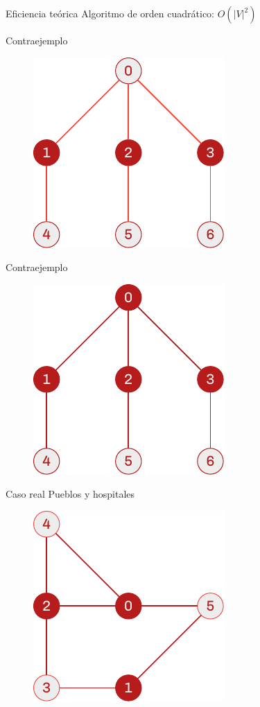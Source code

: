 \documentclass[spanish]{beamer}
\begin{document}
\begin{frame}{Eficiencia teórica}
	Algoritmo de orden cuadrático: $O(|V|^2)$
	

\end{frame}

\begin{frame}{Contraejemplo}

	\begin{figure}[H]
		\centering \includegraphics{./img/grafo2-minimal-pres.pdf}
	\end{figure}
\end{frame}

\begin{frame}{Contraejemplo}

	\begin{figure}[H]
		\centering \includegraphics{./img/grafo2-no-minimal-pres.pdf}
	\end{figure}
\end{frame}

\begin{frame}{Caso real}
	Pueblos y hospitales
	\begin{figure}[H]
		\centering \includegraphics{./img/grafo-ejemplo-pres.pdf}
	\end{figure}
\end{frame}
\end{document}
